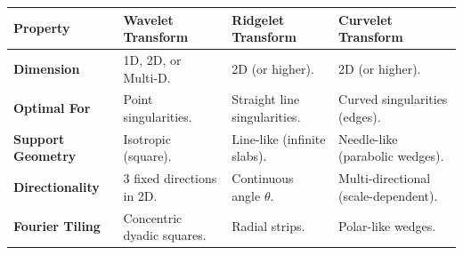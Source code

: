 \documentclass[12pt,a4paper]{article}
\renewcommand{\arraystretch}{1.45}
\begin{document}
\begin{tcolorbox}[tikzbox, title={\textbf{Multi-Resolution Feature Representation Comparison}}]
\par\noindent
{\renewcommand{\arraystretch}{1.45}%
\begin{tabularx}{\linewidth}{|B{3.0cm}|Y|Y|Y|}
\hline
\textbf{Property} & \textbf{Wavelet Transform} & \textbf{Ridgelet Transform} & \textbf{Curvelet Transform} \\
\hline
\textbf{Dimension} & 1D, 2D, or Multi-D. & 2D (or higher). & 2D (or higher). \\
\hline
\textbf{Optimal For} & Point singularities. & Straight line singularities. & Curved singularities (edges). \\
\hline
\textbf{Support Geometry} & Isotropic (square). & Line-like (infinite slabs). & Needle-like (parabolic wedges). \\
\hline
\textbf{Directionality} & 3 fixed directions in 2D. & Continuous angle $\theta$. & Multi-directional (scale-dependent). \\
\hline
\textbf{Fourier Tiling} & Concentric dyadic squares. & Radial strips. & Polar-like wedges. \\
\hline
\end{tabularx}}
\end{tcolorbox}
\end{document}
